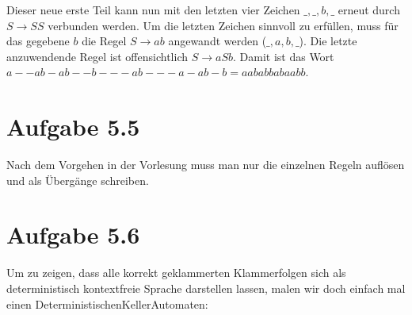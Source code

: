 \documentclass{article}
\newcommand{\rpt}{%
        \raisebox{.2ex}{:}%
        \raisebox{-.4ex}{\rule{.1ex}{2.5ex}\,\rule{.2ex}{2.5ex}}}
\newcommand{\revrpt}{%
        \raisebox{-.2ex}{\rule{.2ex}{2.5ex}\,\rule{.1ex}{2.5ex}}%
        \raisebox{.2ex}{:}}
\begin{document}
Dieser neue erste Teil kann nun mit den letzten vier Zeichen $\_,\_,b,\_$ erneut durch $S \rightarrow SS$ verbunden werden. Um die letzten Zeichen sinnvoll zu erfüllen, muss für das gegebene $b$ die Regel $S \rightarrow ab$ angewandt werden ($\_,a,b,\_$). Die letzte anzuwendende Regel ist offensichtlich $S \rightarrow aSb$. Damit ist das Wort \linebreak $a--ab-ab--b---ab---a-ab-b = aababbabaabb$.


\section*{Aufgabe 5.5}
Nach dem Vorgehen in der Vorlesung muss man nur die einzelnen Regeln auflösen und als Übergänge schreiben.
\begin{center}
\end{center}




\section*{Aufgabe 5.6}
Um zu zeigen, dass alle korrekt geklammerten Klammerfolgen sich als deterministisch kontextfreie Sprache darstellen lassen, malen wir doch einfach mal einen DeterministischenKellerAutomaten:

\begin{center}
\end{center}
\end{document}
